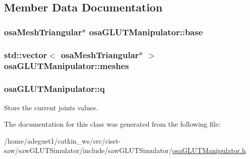 \subsection{Member Data Documentation}
\hypertarget{classosa_g_l_u_t_manipulator_a35862797c40d1a7bf6bf98cb3cec86a8}{
\subsubsection[{base}]{\setlength{\rightskip}{0pt plus 5cm}osa\-Mesh\-Triangular$\ast$ osa\-G\-L\-U\-T\-Manipulator\-::base\hspace{0.3cm}{\ttfamily [protected]}}}\label{classosa_g_l_u_t_manipulator_a35862797c40d1a7bf6bf98cb3cec86a8}
\hypertarget{classosa_g_l_u_t_manipulator_a72841d530b9d0d41cb22cbad04087e34}{
\subsubsection[{meshes}]{\setlength{\rightskip}{0pt plus 5cm}std\-::vector$<$ osa\-Mesh\-Triangular$\ast$ $>$ osa\-G\-L\-U\-T\-Manipulator\-::meshes\hspace{0.3cm}{\ttfamily [protected]}}}\label{classosa_g_l_u_t_manipulator_a72841d530b9d0d41cb22cbad04087e34}
\hypertarget{classosa_g_l_u_t_manipulator_aaa03cdd6825dd64f23586ab753579ffa}{
\subsubsection[{q}]{ osa\-G\-L\-U\-T\-Manipulator\-::q\hspace{0.3cm}{\ttfamily [protected]}}}\label{classosa_g_l_u_t_manipulator_aaa03cdd6825dd64f23586ab753579ffa}


Store the current joints values. 



The documentation for this class was generated from the following file\-:\begin{DoxyCompactItemize}
\item 
/home/adeguet1/catkin\-\_\-ws/src/cisst-\/saw/saw\-G\-L\-U\-T\-Simulator/include/saw\-G\-L\-U\-T\-Simulator/\hyperlink{osa_g_l_u_t_manipulator_8h}{osa\-G\-L\-U\-T\-Manipulator.\-h}\end{DoxyCompactItemize}
